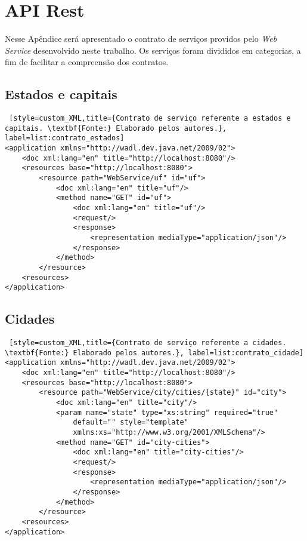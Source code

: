 \chapter*{API Rest}
\label{apendice:api_rest}

Nesse Apêndice será apresentado o contrato de serviços providos pelo \textit{Web Service} desenvolvido neste trabalho. Os serviços foram divididos em categorias, a fim de facilitar a compreensão dos contratos.

\section*{Estados e capitais}

\begin{lstlisting} [style=custom_XML,title={Contrato de serviço referente a estados e capitais. \textbf{Fonte:} Elaborado pelos autores.}, label=list:contrato_estados] 	
<application xmlns="http://wadl.dev.java.net/2009/02">
	<doc xml:lang="en" title="http://localhost:8080"/>
	<resources base="http://localhost:8080">
		<resource path="WebService/uf" id="uf">
			<doc xml:lang="en" title="uf"/>
			<method name="GET" id="uf">
				<doc xml:lang="en" title="uf"/>
				<request/>
				<response>
					<representation mediaType="application/json"/>
				</response>
			</method>
		</resource>
	<resources>
</application>
\end{lstlisting}


\section*{Cidades}

\begin{lstlisting} [style=custom_XML,title={Contrato de serviço referente a cidades. \textbf{Fonte:} Elaborado pelos autores.}, label=list:contrato_cidade] 	
<application xmlns="http://wadl.dev.java.net/2009/02">
	<doc xml:lang="en" title="http://localhost:8080"/>
	<resources base="http://localhost:8080">
		<resource path="WebService/city/cities/{state}" id="city">
			<doc xml:lang="en" title="city"/>
			<param name="state" type="xs:string" required="true" 
				default="" style="template" 
				xmlns:xs="http://www.w3.org/2001/XMLSchema"/>
			<method name="GET" id="city-cities">
				<doc xml:lang="en" title="city-cities"/>
				<request/>
				<response>
					<representation mediaType="application/json"/>
				</response>
			</method>
		</resource>
	<resources>
</application>
\end{lstlisting}


